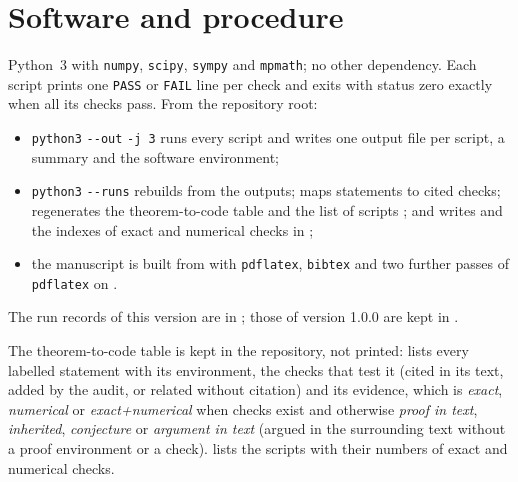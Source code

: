 \section{Software and procedure}
\label{app:repro:soft}

Python~3 with \texttt{numpy}, \texttt{scipy}, \texttt{sympy} and \texttt{mpmath}; no other dependency. Each script prints one
\texttt{PASS} or \texttt{FAIL} line per check and exits with status zero exactly when all its checks pass. From the repository root:
{\raggedright
\begin{itemize}[leftmargin=1.6em]
\item \texttt{python3}  \texttt{-{}-out}  \texttt{-j 3} runs every script and writes one output file
per script, a summary and the software environment;
\item \texttt{python3}  \texttt{-{}-runs}  rebuilds  from
the outputs;  maps statements to cited checks;  regenerates
the theorem-to-code table  and the list of scripts ; and  writes  and
the indexes of exact and numerical checks in ;
\item the manuscript is built from  with \texttt{pdflatex}, \texttt{bibtex} and two further passes of \texttt{pdflatex} on
.
\end{itemize}\par}
The run records of this version are in ; those of version 1.0.0 are kept in
.

The theorem-to-code table is kept in the repository, not printed:  lists every labelled statement with
its environment, the checks that test it (cited in its text, added by the audit, or related without citation) and its evidence, which is
\emph{exact}, \emph{numerical} or \emph{exact+numerical} when checks exist and otherwise \emph{proof in text}, \emph{inherited}, \emph{conjecture}
or \emph{argument in text} (argued in the surrounding text without a proof environment or a check).  lists the
scripts with their numbers of exact and numerical checks.
